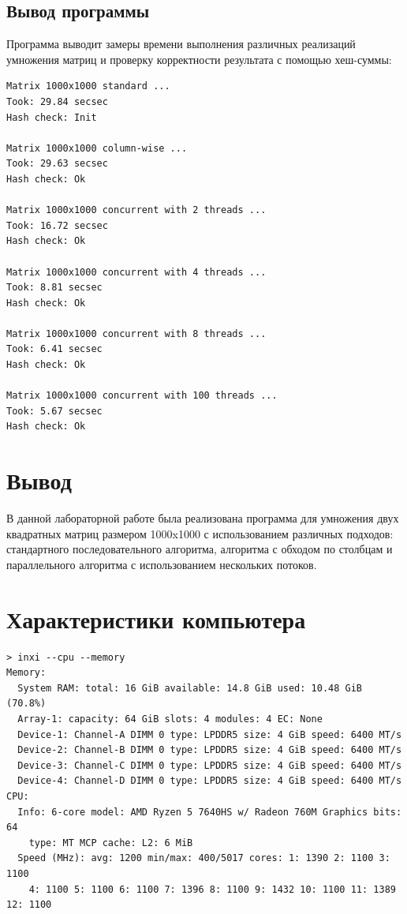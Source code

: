 \documentclass[a4paper, 14pt]{extarticle}
\begin{document}
\subsection*{Вывод программы}\label{Subsect::program_output}

Программа выводит замеры времени выполнения различных реализаций умножения матриц и проверку корректности результата с помощью хеш-суммы:

\begin{lstlisting}[caption={Вывод программы}, label={lst:program_output}]
Matrix 1000x1000 standard ...
Took: 29.84 secsec
Hash check: Init

Matrix 1000x1000 column-wise ...
Took: 29.63 secsec
Hash check: Ok

Matrix 1000x1000 concurrent with 2 threads ...
Took: 16.72 secsec
Hash check: Ok

Matrix 1000x1000 concurrent with 4 threads ...
Took: 8.81 secsec
Hash check: Ok

Matrix 1000x1000 concurrent with 8 threads ...
Took: 6.41 secsec
Hash check: Ok

Matrix 1000x1000 concurrent with 100 threads ...
Took: 5.67 secsec
Hash check: Ok
\end{lstlisting}

\section*{Вывод}\label{Sect::conclusion}
В данной лабораторной работе была реализована программа для умножения двух квадратных матриц размером 1000x1000 с использованием различных подходов: стандартного последовательного алгоритма, алгоритма с обходом по столбцам и параллельного алгоритма с использованием нескольких потоков.

\section*{Характеристики компьютера}

\begin{lstlisting}[caption={Характеристики компьютера}, label={lst:computer_specs}]
> inxi --cpu --memory
Memory:
  System RAM: total: 16 GiB available: 14.8 GiB used: 10.48 GiB (70.8%)
  Array-1: capacity: 64 GiB slots: 4 modules: 4 EC: None
  Device-1: Channel-A DIMM 0 type: LPDDR5 size: 4 GiB speed: 6400 MT/s
  Device-2: Channel-B DIMM 0 type: LPDDR5 size: 4 GiB speed: 6400 MT/s
  Device-3: Channel-C DIMM 0 type: LPDDR5 size: 4 GiB speed: 6400 MT/s
  Device-4: Channel-D DIMM 0 type: LPDDR5 size: 4 GiB speed: 6400 MT/s
CPU:
  Info: 6-core model: AMD Ryzen 5 7640HS w/ Radeon 760M Graphics bits: 64
    type: MT MCP cache: L2: 6 MiB
  Speed (MHz): avg: 1200 min/max: 400/5017 cores: 1: 1390 2: 1100 3: 1100
    4: 1100 5: 1100 6: 1100 7: 1396 8: 1100 9: 1432 10: 1100 11: 1389 12: 1100
\end{lstlisting}
\end{document}
